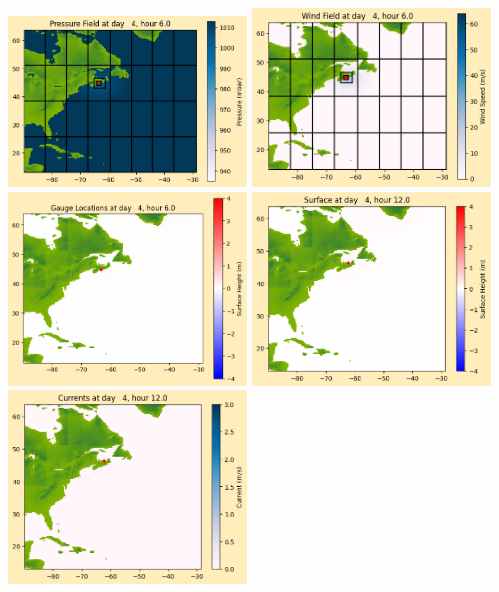 \documentclass[11pt]{article}
\begin{document}
\includegraphics[width=0.475\textwidth]{frame0029fig1012.png}
\vskip 10pt 
\includegraphics[width=0.475\textwidth]{frame0029fig1013.png}
\includegraphics[width=0.475\textwidth]{frame0029fig1014.png}
\vskip 10pt 
\includegraphics[width=0.475\textwidth]{frame0030fig1001.png}
\includegraphics[width=0.475\textwidth]{frame0030fig1002.png}
\end{document}
